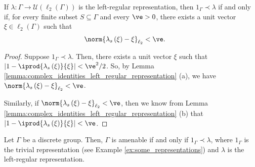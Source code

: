 \begin{lemma}\label{lemma:l2_unit_vector}
  If $\lambda\colon\Gamma\rightarrow \mathcal{U}\left( \ell_2\left( \Gamma \right) \right)$ is the left-regular representation, then $1_{\Gamma}\prec \lambda$ if and only if, for every finite subset $S\subseteq \Gamma$ and every $\ve > 0$, there exists a unit vector $\xi\in \ell_2\left( \Gamma \right)$ such that
  \begin{align*}
    \norm{\lambda_s\left( \xi \right) - \xi}_{\ell_2} &< \ve.
  \end{align*}
\end{lemma}
\begin{proof}
  Suppose $1_{\Gamma}\prec \lambda$. Then, there exists a unit vector $\xi$ such that $\left\vert 1 - \iprod{\lambda_s\left( \xi \right)}{\xi} \right\vert < \ve^2/2$. So, by Lemma \ref{lemma:complex_identities_left_regular_representation} (a), we have $\norm{\lambda_s\left( \xi \right) - \xi}_{\ell_2} < \ve$.\newline

  Similarly, if $\norm{\lambda_s\left( \xi \right) - \xi}_{\ell_2} < \ve$, then we know from Lemma \ref{lemma:complex_identities_left_regular_representation} (b) that $ \left\vert 1 - \iprod{\lambda_s\left( \xi \right)}{\xi} \right\vert < \ve $.
\end{proof}
\begin{theorem}
  Let $\Gamma$ be a discrete group. Then, $\Gamma$ is amenable if and only if $1_{\Gamma}\prec \lambda$, where $1_{\Gamma}$ is the trivial representation (see Example \ref{ex:some_representations}) and $\lambda$ is the left-regular representation.
\end{theorem}

